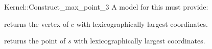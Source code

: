 \begin{ccRefFunctionObjectConcept}{Kernel::Construct_max_point_3}
A model for this must provide:


       {returns the vertex of $c$ with lexicographically largest coordinates.}

       {returns the point of $s$ with lexicographically largest coordinates.}

\end{ccRefFunctionObjectConcept}
